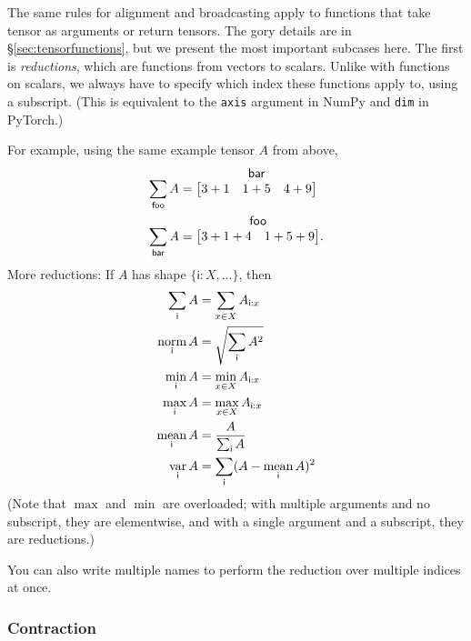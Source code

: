 \documentclass{article}
\makeatletter
\newcommand{\name}[1]{\mathsf{#1}}
\newcommand{\nsum}[1]{\mathop{\sum}_{\name{#1}}}
\newcommand{\nfun}[2]{\mathop{\text{#2}}\displaylimits_{\name{#1}}}
\newcommand{\tuple}[1]{\{ #1\}}
\newcommand{\nmatrix}[3]{\name{#1}\begin{array}[b]{@{}c@{}}\name{#2}\\\begin{bmatrix}#3\end{bmatrix}\end{array}}
\makeatother
\begin{document}
The same rules for alignment and broadcasting apply to functions that take tensor as arguments or return tensors. The gory details are in \S\ref{sec:tensorfunctions}, but we present the most important subcases here. The first is \emph{reductions}, which are functions from vectors to scalars. Unlike with functions on scalars, we always have to specify which index these functions apply to, using a subscript. (This is equivalent to the \verb|axis| argument in NumPy and \verb|dim| in PyTorch.)

For example, using the same example tensor $A$ from above,
\begin{align*}
\nsum{foo} A &= \nmatrix{}{bar}{
  3+1 & 1+5 & 4+9
} \\
\nsum{bar} A &= \nmatrix{}{foo}{
  3+1+4 & 1+5+9
}.
\end{align*}
More reductions: If $A$ has shape $\tuple{\name{i}:X, \ldots}$, then
\begin{align*}
  \nsum{i} A &= \sum_{x \in X} A_{\name{i}: x} \\
  \nfun{i}{norm} A &= \sqrt{\nsum{i} A^2} \\
  \nfun{i}{min} A &= \min_{x \in X} A_{\name{i}: x} \\
  \nfun{i}{max} A &= \max_{x \in X} A_{\name{i}: x} \\
  \nfun{i}{mean} A &= \frac{A}{\nsum{i} A} \\
  \nfun{i}{var} A &= \nsum{i} (A - \nfun{i}{mean} A)^2
\end{align*}
(Note that $\max$ and $\min$ are overloaded; with multiple arguments and no subscript, they are elementwise, and with a single argument and a subscript, they are reductions.)

You can also write multiple names to perform the reduction over multiple indices at once.

\subsubsection{Contraction}
\end{document}
